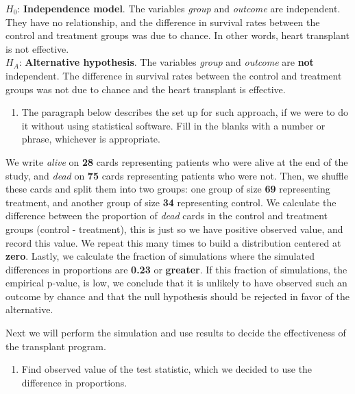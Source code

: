 \documentclass[
]{book}
\providecommand{\tightlist}{%
  \setlength{\itemsep}{0pt}\setlength{\parskip}{0pt}}
\begin{document}
\(H_0\): \textbf{Independence model}. The variables \emph{group} and \emph{outcome} are independent. They have no relationship, and the difference in survival rates between the control and treatment groups was due to chance. In other words, heart transplant is not effective.\\
\(H_A\): \textbf{Alternative hypothesis}. The variables \emph{group} and \emph{outcome} are \textbf{not} independent. The difference in survival rates between the control and treatment groups was not due
to chance and the heart transplant is effective.

\begin{enumerate}
\def\labelenumi{\alph{enumi}.}
\setcounter{enumi}{2}
\tightlist
\item
  The paragraph below describes the set up for such approach, if we were to do it without using statistical software. Fill in the blanks with a number or phrase, whichever is appropriate.
\end{enumerate}

We write \emph{alive} on \textbf{28} cards representing patients who were alive at the end of the study, and \emph{dead} on \textbf{75} cards representing patients who were not. Then, we shuffle these cards and split them into two groups: one group of size \textbf{69} representing treatment, and another group of size \textbf{34} representing control. We calculate the difference between the proportion of \emph{dead} cards in the control and treatment groups (control - treatment), this is just so we have positive observed value, and record this value. We repeat this many times to build a distribution centered at \textbf{zero}. Lastly, we calculate the fraction of simulations where the simulated differences in proportions are \textbf{0.23} or \textbf{greater}. If this fraction of simulations, the empirical p-value, is low, we conclude that it is unlikely to have observed such an outcome by chance and that the null hypothesis should be rejected in favor of the alternative.

Next we will perform the simulation and use results to decide the effectiveness of the transplant program.

\begin{enumerate}
\def\labelenumi{\alph{enumi}.}
\setcounter{enumi}{3}
\tightlist
\item
  Find observed value of the test statistic, which we decided to use the difference in proportions.
\end{enumerate}
\end{document}
